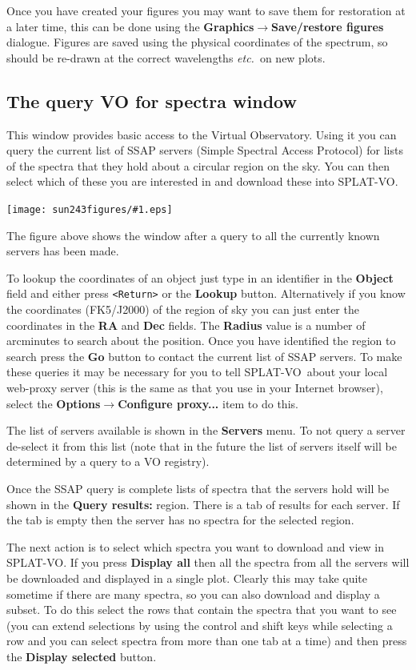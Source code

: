 \documentclass[twoside,11pt]{article}
\newcommand{\htmladdimg}[1]{}
\newcommand{\latexhtml}[2]{#1}
\newcommand{\xlabel}[1]{}
\renewcommand{\_}{\texttt{\symbol{95}}}
\newcommand{\SPLAT}{\textsf{SPLAT-VO}}
\newcommand{\mainfigure}[1]
{\begin{center}
 \latexhtml{\texttt{[image: sun243\_figures/\#1.eps]}}{\htmladdimg{#1.gif}}
 \end{center}
}
\newcommand{\submenuitem}[2]{\latexhtml{\textbf{#1$\rightarrow$#2}}{\textbf{#1->#2}}}
\newcommand{\labelitem}[1]{\textbf{#1}}
\newcommand{\hitext}[1]{\texttt{#1}}
\newcommand{\etc}{\textit{etc.}}
\begin{document}
Once you have created your figures you may want to save them for restoration
at a later time, this can be done using the
\submenuitem{Graphics}{Save/restore figures} dialogue. Figures are saved using
the physical coordinates of the spectrum, so should be re-drawn at the correct
wavelengths \etc\ on new plots.


\newpage
\subsection{The query VO for spectra window{\xlabel{ssap_window}}}

This window provides basic access to the Virtual Observatory. Using it you can
query the current list of SSAP servers (Simple Spectral Access Protocol) for
lists of the spectra that they hold about a circular region on the sky. You
can then select which of these you are interested in and download these into
\SPLAT.

\mainfigure{ssapwindow}

The figure above shows the window after a query to all the currently known
servers has been made.

To lookup the coordinates of an object just type in an identifier in the
\labelitem{Object} field and either press \hitext{<Return>} or the
\labelitem{Lookup} button. Alternatively if you know the coordinates
(FK5/J2000) of the region of sky you can just enter the coordinates in the
\labelitem{RA} and \labelitem{Dec} fields. The \labelitem{Radius} value is a
number of arcminutes to search about the position. Once you have identified
the region to search press the \labelitem{Go} button to contact the current
list of SSAP servers. To make these queries it may be necessary for you to
tell \SPLAT\ about your local web-proxy server (this is the same as that you
use in your Internet browser), select the
\submenuitem{Options}{Configure proxy...} item to do this.

The list of servers available is shown in the \labelitem{Servers} menu. To not
query a server de-select it from this list (note that in the future the list
of servers itself will be determined by a query to a VO registry).

Once the SSAP query is complete lists of spectra that the servers hold will be
shown in the \labelitem{Query results:} region. There is a tab of results for
each server. If the tab is empty then the server has no spectra for the
selected region.

The next action is to select which spectra you want to download and view in
\SPLAT. If you press \labelitem{Display all} then all the spectra from all the
servers will be downloaded and displayed in a single plot. Clearly this may
take quite sometime if there are many spectra, so you can also download and
display a subset. To do this select the rows that contain the spectra that
you want to see (you can extend selections by using the control and shift keys
while selecting a row and you can select spectra from more than one tab at a
time) and then press the \labelitem{Display selected} button.
\end{document}
